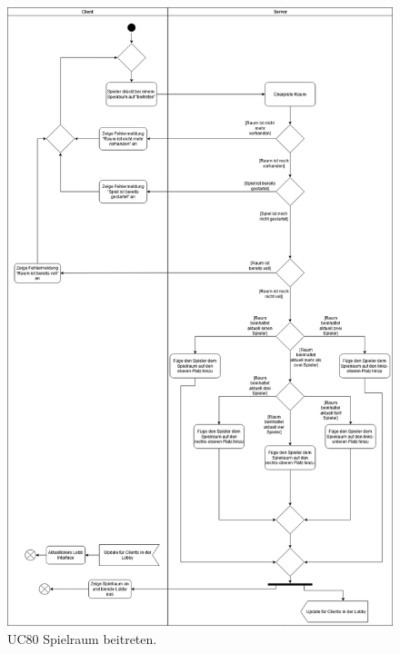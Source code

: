 \begin{figure}[h]
	\centering
	\includegraphics[width=\textwidth]{ad/UC80_Spielraum beitreten_v3.png}
	\caption{UC80 Spielraum beitreten.}
\end{figure}

